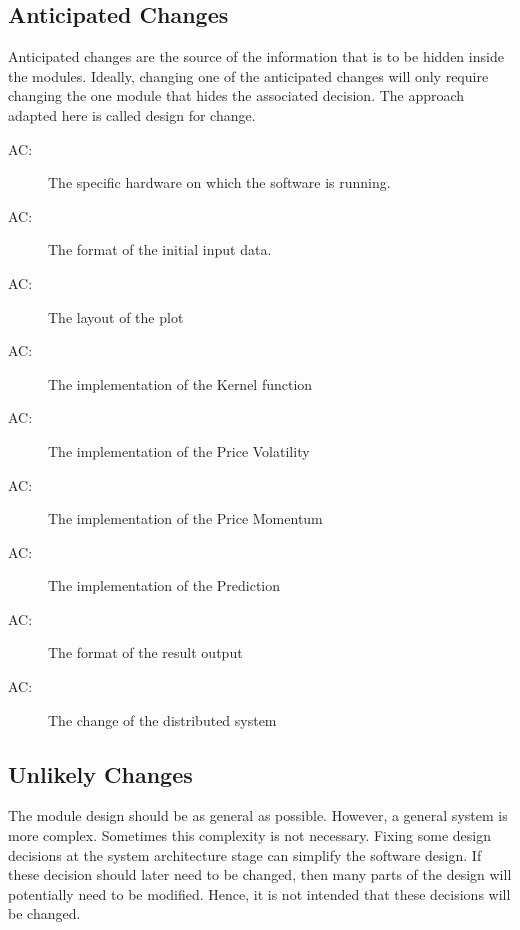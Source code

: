 \documentclass[12pt, titlepage]{article}
\newcounter{acnum}
\newcommand{\actheacnum}{AC\theacnum}
\begin{document}
\subsection{Anticipated Changes} \label{SecAchange}

Anticipated changes are the source of the information that is to be hidden
inside the modules. Ideally, changing one of the anticipated changes will only
require changing the one module that hides the associated decision. The approach
adapted here is called design for
change.

\begin{description}
\item[ \actheacnum \label{AC1}:] The specific
hardware on which the software is running.
\item[ \actheacnum \label{AC2}:] The format of the
initial input data.
\item[ \actheacnum \label{AC3}:] The layout of the plot
\item[ \actheacnum \label{AC4}:] The implementation of the Kernel function
\item[ \actheacnum \label{AC5}:] The implementation of the Price Volatility
\item[ \actheacnum \label{AC6}:] The implementation of the Price Momentum
\item[ \actheacnum \label{AC7}:] The implementation of the Prediction
\item[ \actheacnum \label{AC8}:] The format of the result output 
\item[ \actheacnum \label{AC9}:] The change of the distributed system
\end{description}

\subsection{Unlikely Changes} \label{SecUchange}

The module design should be as general as possible. However, a general system is
more complex. Sometimes this complexity is not necessary. Fixing some design
decisions at the system architecture stage can simplify the software design. If
these decision should later need to be changed, then many parts of the design
will potentially need to be modified. Hence, it is not intended that these
decisions will be changed.
\end{document}
